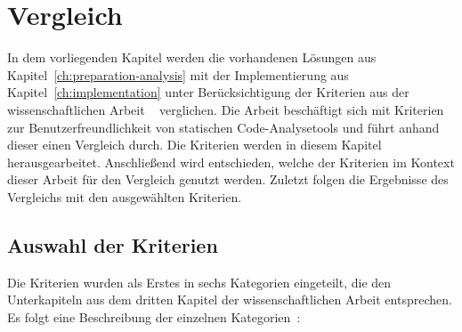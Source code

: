 \chapter{Vergleich}\label{ch:comparison}

In dem vorliegenden Kapitel werden die vorhandenen Lösungen aus Kapitel~\ref{ch:preparation-analysis} mit
der Implementierung aus Kapitel~\ref{ch:implementation} unter Berücksichtigung der Kriterien aus der wissenschaftlichen Arbeit
~\cite[A Large-Scale Study of Usability Criteria Addressed by Static Analysis Tools]{usability-criteria-static-analysis-tools} verglichen.
Die Arbeit beschäftigt sich mit Kriterien zur Benutzerfreundlichkeit von statischen Code-Analysetools und führt anhand dieser einen
Vergleich durch. Die Kriterien werden in diesem Kapitel herausgearbeitet. Anschließend wird entschieden, welche der Kriterien
im Kontext dieser Arbeit für den Vergleich genutzt werden. Zuletzt folgen die Ergebnisse des Vergleichs mit den ausgewählten Kriterien.

\section{Auswahl der Kriterien}

Die Kriterien wurden als Erstes in sechs Kategorien eingeteilt, die den Unterkapiteln aus dem dritten Kapitel der wissenschaftlichen Arbeit
entsprechen. Es folgt eine Beschreibung der einzelnen Kategorien~\cite{usability-criteria-static-analysis-tools}:

